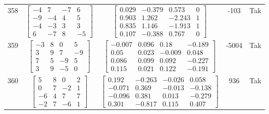 \documentclass[a4paper,12pt]{article}
\begin{document}
\begin{tabular}{c c c c c}
358
&
$\begin{bmatrix} -4 & 7 & -7 & 6 \\ -9 & -4 & 4 & 5 \\ -4 & -3 & 3 & 3 \\ 6 & -7 & 8 & -5 \end{bmatrix}$
&
$\begin{bmatrix} 0.029 & -0.379 & 0.573 & 0 \\ 0.903 & 1.262 & -2.243 & 1 \\ 0.835 & 1.146 & -1.913 & 1 \\ 0.107 & -0.388 & 0.767 & 0 \end{bmatrix}$
&
-103
&
Tak
\\
359
&
$\begin{bmatrix} -3 & 8 & 0 & 5 \\ 3 & 9 & 7 & -9 \\ 7 & 5 & -9 & 5 \\ 3 & 9 & -5 & 0 \end{bmatrix}$
&
$\begin{bmatrix} -0.007 & 0.096 & 0.18 & -0.189 \\ 0.05 & 0.023 & -0.009 & 0.048 \\ 0.086 & 0.099 & 0.092 & -0.227 \\ 0.115 & 0.021 & 0.122 & -0.191 \end{bmatrix}$
&
-5004
&
Tak
\\
360
&
$\begin{bmatrix} 5 & 8 & 0 & 2 \\ 0 & 7 & -2 & 1 \\ -6 & 4 & 7 & 7 \\ -2 & 7 & -6 & 1 \end{bmatrix}$
&
$\begin{bmatrix} 0.192 & -0.263 & -0.026 & 0.058 \\ -0.071 & 0.369 & -0.013 & -0.138 \\ -0.096 & 0.381 & 0.013 & -0.279 \\ 0.301 & -0.817 & 0.115 & 0.407 \end{bmatrix}$
&
936
&
Tak
\\
\end{tabular} \egroup \newpage
\end{document}
